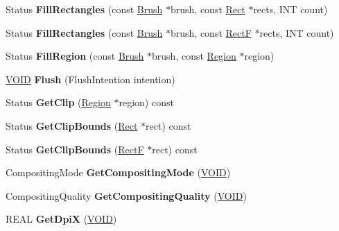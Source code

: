 \begin{DoxyCompactItemize}
Status {\bfseries Fill\+Rectangles} (const \hyperlink{class_brush}{Brush} $\ast$brush, const \hyperlink{struct_rect}{Rect} $\ast$rects, I\+NT count)
\item 
\mbox{\label{class_graphics_ac4a345833235b56e1078e37b1300f53d}} 
Status {\bfseries Fill\+Rectangles} (const \hyperlink{class_brush}{Brush} $\ast$brush, const \hyperlink{struct_rect_f}{RectF} $\ast$rects, I\+NT count)
\item 
\mbox{\label{class_graphics_acd9f4166637440526c79af082635f5c5}} 
Status {\bfseries Fill\+Region} (const \hyperlink{class_brush}{Brush} $\ast$brush, const \hyperlink{class_region}{Region} $\ast$region)
\item 
\mbox{\label{class_graphics_a78f9996d2b99f4a47e5812e04276aa2b}} 
\hyperlink{interfacevoid}{V\+O\+ID} {\bfseries Flush} (Flush\+Intention intention)
\item 
\mbox{\label{class_graphics_aa7506d93a0462ea4f79d027ee3bb36bd}} 
Status {\bfseries Get\+Clip} (\hyperlink{class_region}{Region} $\ast$region) const
\item 
\mbox{\label{class_graphics_a4481a3ca4fa722d1ec17758df2dc9633}} 
Status {\bfseries Get\+Clip\+Bounds} (\hyperlink{struct_rect}{Rect} $\ast$rect) const
\item 
\mbox{\label{class_graphics_a85ee563b609c2641bbc0a34d5abd1b76}} 
Status {\bfseries Get\+Clip\+Bounds} (\hyperlink{struct_rect_f}{RectF} $\ast$rect) const
\item 
\mbox{\label{class_graphics_a01abbc341a9e8bf7ce3afff91c358d74}} 
Compositing\+Mode {\bfseries Get\+Compositing\+Mode} (\hyperlink{interfacevoid}{V\+O\+ID})
\item 
\mbox{\label{class_graphics_a6ce56dfe909ea763dc3447d4d42727f8}} 
Compositing\+Quality {\bfseries Get\+Compositing\+Quality} (\hyperlink{interfacevoid}{V\+O\+ID})
\item 
\mbox{\label{class_graphics_a6fb9f4762a88d07f2dfe13b29d540f87}} 
R\+E\+AL {\bfseries Get\+DpiX} (\hyperlink{interfacevoid}{V\+O\+ID})

\end{DoxyCompactItemize}

